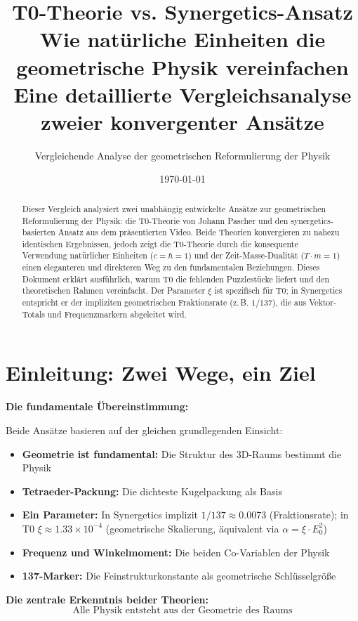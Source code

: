 \documentclass[12pt,a4paper]{article}
\title{\textbf{T0-Theorie vs. Synergetics-Ansatz}\\[0.5cm]
	\large Wie natürliche Einheiten die geometrische Physik vereinfachen\\[0.3cm]
	\normalsize Eine detaillierte Vergleichsanalyse zweier konvergenter Ansätze}
\author{Vergleichende Analyse der geometrischen Reformulierung der Physik}
\date{\today}
\newcommand{\xipar}{\xi}
\begin{document}
	
	\maketitle
	
	\begin{abstract}
		Dieser Vergleich analysiert zwei unabhängig entwickelte Ansätze zur geometrischen Reformulierung der Physik: die T0-Theorie von Johann Pascher und den synergetics-basierten Ansatz aus dem präsentierten Video. Beide Theorien konvergieren zu nahezu identischen Ergebnissen, jedoch zeigt die T0-Theorie durch die konsequente Verwendung natürlicher Einheiten ($c = \hbar = 1$) und der Zeit-Masse-Dualität ($T \cdot m = 1$) einen eleganteren und direkteren Weg zu den fundamentalen Beziehungen. Dieses Dokument erklärt ausführlich, warum T0 die fehlenden Puzzlestücke liefert und den theoretischen Rahmen vereinfacht. Der Parameter $\xipar$ ist spezifisch für T0; in Synergetics entspricht er der impliziten geometrischen Fraktionsrate (z.\,B. $1/137$), die aus Vektor-Totals und Frequenzmarkern abgeleitet wird.
	\end{abstract}
	
	\tableofcontents
	\newpage
	
	\section{Einleitung: Zwei Wege, ein Ziel}
	
	\begin{gemeinsam}
		\textbf{Die fundamentale Übereinstimmung:}
		
		Beide Ansätze basieren auf der gleichen grundlegenden Einsicht:
		\begin{itemize}
			\item \textbf{Geometrie ist fundamental:} Die Struktur des 3D-Raums bestimmt die Physik
			\item \textbf{Tetraeder-Packung:} Die dichteste Kugelpackung als Basis
			\item \textbf{Ein Parameter:} In Synergetics implizit $1/137 \approx 0.0073$ (Fraktionsrate); in T0 $\xipar \approx 1.33 \times 10^{-4}$ (geometrische Skalierung, äquivalent via $\alpha = \xipar \cdot E_0^2$)
			\item \textbf{Frequenz und Winkelmoment:} Die beiden Co-Variablen der Physik
			\item \textbf{137-Marker:} Die Feinstrukturkonstante als geometrische Schlüsselgröße
		\end{itemize}
		
		\textbf{Die zentrale Erkenntnis beider Theorien:}
		\begin{equation}
			\boxed{\text{Alle Physik entsteht aus der Geometrie des Raums}}
		\end{equation}
	\end{gemeinsam}
	
\end{document}
